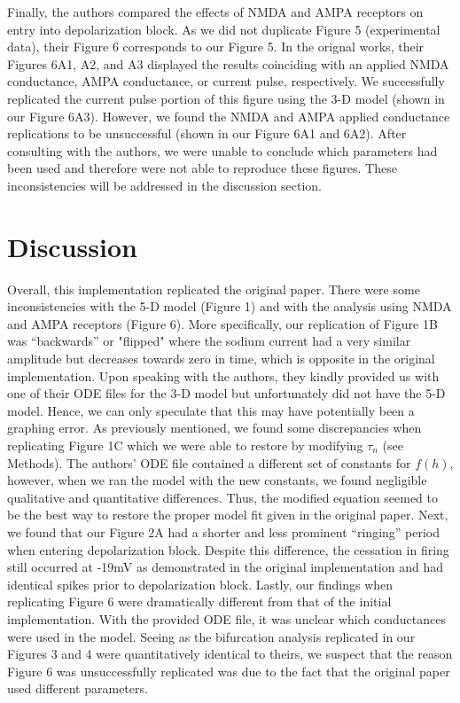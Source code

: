 Finally, the authors compared the effects of NMDA and AMPA receptors on entry into depolarization block. As we did not duplicate Figure 5 (experimental data), their Figure 6 corresponds to our Figure 5. In the orignal works, their Figures 6A1, A2, and A3 displayed the results coinciding with an applied NMDA conductance, AMPA conductance, or current pulse, respectively. We successfully replicated the current pulse portion of this figure using the 3-D model (shown in our Figure 6A3). However, we found the NMDA and AMPA applied conductance replications to be unsuccessful (shown in our Figure 6A1 and 6A2). After consulting with the authors, we were unable to conclude which parameters had been used and therefore were not able to reproduce these figures. These inconsistencies will be addressed in the discussion section.  

\section{Discussion}

Overall, this implementation replicated the original paper. There were some inconsistencies with the 5-D model (Figure 1) and with the analysis using NMDA and AMPA receptors (Figure 6). More specifically, our replication of Figure 1B was “backwards” or "flipped" where the sodium current had a very similar amplitude but decreases towards zero in time, which is opposite in the original implementation. Upon speaking with the authors, they kindly provided us with one of their ODE files for the 3-D model but unfortunately did not have the 5-D model. Hence, we can only speculate that this may have potentially been a graphing error. As previously mentioned, we found some discrepancies when replicating Figure 1C which we were able to restore by modifying $\tau_n$  (see Methods). The authors’ ODE file contained a different set of constants for $f(h)$, however, when we ran the model with the new constants, we found negligible qualitative and quantitative differences.  Thus, the modified equation seemed to be the best way to restore the proper model fit given in the original paper. Next, we found that our Figure 2A had a shorter and less prominent “ringing” period when entering depolarization block. Despite this difference, the cessation in firing still occurred at -19mV as demonstrated in the original implementation and had identical spikes prior to depolarization block. Lastly, our findings when replicating Figure 6 were dramatically different from that of the initial implementation. With the provided ODE file, it was unclear which conductances were used in the model. Seeing as the bifurcation analysis replicated in our Figures 3 and 4 were quantitatively identical to theirs, we suspect that the reason Figure 6 was unsuccessfully replicated was due to the fact that the original paper used different parameters.

